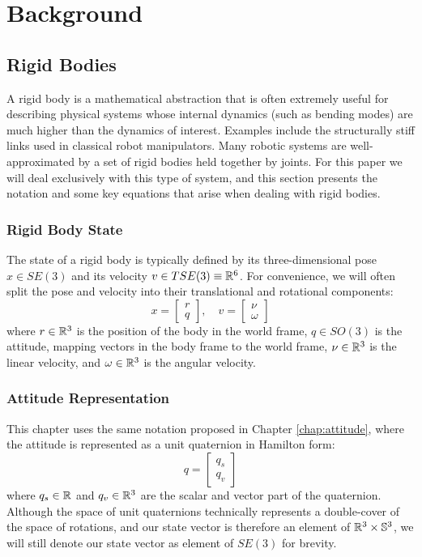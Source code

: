 \documentclass[../root.tex]{subfiles}
\begin{document}
\section{Background}
\subsection{Rigid Bodies}
A rigid body is a mathematical abstraction that is often extremely useful for describing 
physical systems whose internal dynamics (such as bending modes) are much higher than the 
dynamics of interest. Examples include the structurally stiff links used in classical 
robot manipulators. Many robotic systems are well-approximated by a set of rigid bodies 
held together by joints. For this paper we will deal exclusively with this type of system,
and this section presents the notation and some key equations that arise when dealing with
rigid bodies.

\subsubsection{Rigid Body State}

The state of a rigid body is typically defined by its three-dimensional pose $x \in SE(3)$
and its velocity $v \in TSE(3) \equiv \mathbb{R}^6$. For convenience, we will often split the 
pose and velocity into their translational and rotational components:
\begin{equation}
    x = \begin{bmatrix}
        r \\ q
    \end{bmatrix}, \quad 
    v = \begin{bmatrix}
        \nu \\ \omega     
    \end{bmatrix}
\end{equation}
where $r \in \mathbb{R}^3$ is the position of the body in the world frame, $q \in SO(3)$ is the 
attitude, mapping vectors in the body frame to the world frame, $\nu \in \mathbb{R}^3$ 
is the linear velocity, and $\omega \in \mathbb{R}^3$ is the angular velocity. 

\subsubsection{Attitude Representation}

This chapter uses the same notation proposed in Chapter \ref{chap:attitude}, where the 
attitude is represented as a unit quaternion in Hamilton form:  
\begin{equation}
    q = \begin{bmatrix}
        q_s \\ q_v
    \end{bmatrix}
\end{equation}
where $q_s \in \mathbb{R}$ and $q_v \in \mathbb{R}^3$ are the scalar and vector part of the quaternion. 
Although the space of unit quaternions technically represents a double-cover of the space 
of rotations, and our state vector is therefore an element of $\mathbb{R}^3 \times \mathbb{S}^3$,
we will still denote our state vector as element of $SE(3)$ for brevity.
\end{document}
